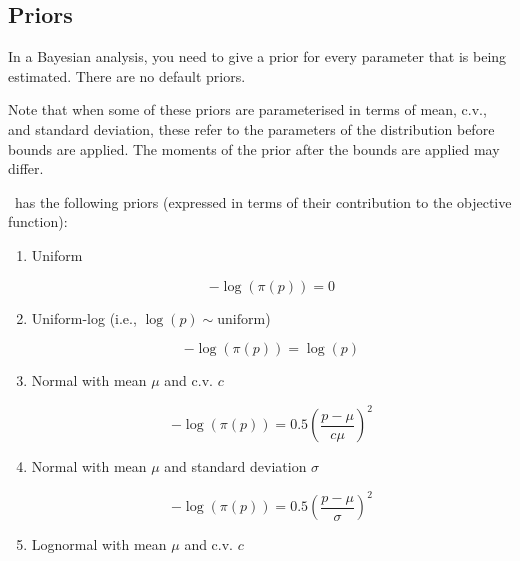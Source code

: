 \subsection{Priors\label{sec:priors}}

In a Bayesian analysis, you need to give a prior for every parameter that is being estimated. There are no default priors.  

Note that when some of these priors are parameterised in terms of mean, c.v., and standard deviation, these refer to the parameters of the distribution before bounds are applied. The moments of the prior after the bounds are applied may differ.

\CNAME\ has the following priors (expressed in terms of their contribution to the objective function): 

\begin{enumerate}
\item{Uniform}

\begin{equation}
 - \log \left(\pi \left(p \right) \right) = 0
\end{equation}

\item{Uniform-log} (i.e., $\log(p) \sim \text{uniform}$)

\begin{equation}
 - \log \left(\pi \left(p \right) \right) = \log \left( p \right)
\end{equation}

\item{Normal with mean $\mu$ and c.v. $c$}

\begin{equation}
 - \log \left(\pi \left(p \right) \right) = 0.5\left(\frac{p - \mu}{c\mu} \right)^2 
\end{equation}

\item{Normal with mean $\mu$ and standard deviation $\sigma$}

\begin{equation}
 - \log \left(\pi \left(p \right) \right) = 0.5\left(\frac{p - \mu}
{\sigma }\right)^2
\end{equation}

\item{Lognormal with mean $\mu$ and c.v. $c$} 


\end{enumerate}

